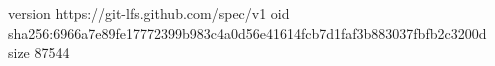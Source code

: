 version https://git-lfs.github.com/spec/v1
oid sha256:6966a7e89fe17772399b983c4a0d56e41614fcb7d1faf3b883037fbfb2c3200d
size 87544
